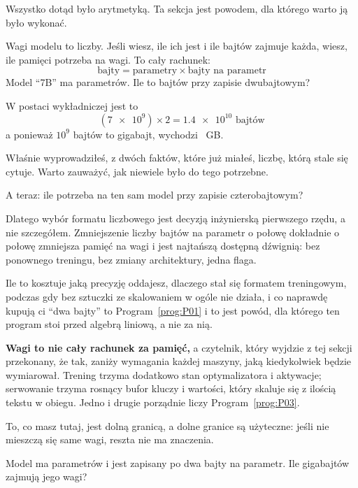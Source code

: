 \begin{fr}
Wszystko dotąd było arytmetyką. Ta sekcja jest powodem, dla którego warto ją
było wykonać.

Wagi modelu to liczby. Jeśli wiesz, ile ich jest i ile bajtów zajmuje każda,
wiesz, ile pamięci potrzeba na wagi. To cały rachunek:
\[ \text{bajty} = \text{parametry} \times \text{bajty na parametr} \]
Model \enquote{7B} ma  parametrów. Ile to bajtów przy zapisie
dwubajtowym?
\nextframe
\end{fr}

\begin{fr}
W postaci wykładniczej jest to
\[ (\num{7e9}) \times 2 = \num{1.4e10} \text{ bajtów} \]
a ponieważ $10^{9}$ bajtów to gigabajt, wychodzi ~GB.

Właśnie wyprowadziłeś, z dwóch faktów, które już miałeś, liczbę, którą stale
się cytuje. Warto zauważyć, jak niewiele było do tego potrzebne.

A teraz: ile potrzeba na ten sam model przy zapisie czterobajtowym?
\nextframe
\end{fr}

\begin{fr}
\begin{aibox}
Dlatego wybór formatu liczbowego jest decyzją inżynierską pierwszego rzędu, a
nie szczegółem. Zmniejszenie liczby bajtów na parametr o połowę dokładnie o
połowę zmniejsza pamięć na wagi i jest najtańszą dostępną dźwignią: bez
ponownego treningu, bez zmiany architektury, jedna flaga.

Ile to kosztuje \dash{} jaką precyzję oddajesz, dlaczego  stał się
formatem treningowym, podczas gdy  bez sztuczki ze skalowaniem w
ogóle nie działa, i co naprawdę kupują ci \enquote{dwa bajty} \dash{} to
Program~\ref{prog:P01} i to jest powód, dla którego ten program stoi przed
algebrą liniową, a nie za nią.
\end{aibox}

\begin{warning}
\textbf{Wagi to nie cały rachunek za pamięć,} a czytelnik, który wyjdzie z tej
sekcji przekonany, że tak, zaniży wymagania każdej maszyny, jaką kiedykolwiek
będzie wymiarował. Trening trzyma dodatkowo stan optymalizatora i aktywacje;
serwowanie trzyma rosnący bufor kluczy i wartości, który skaluje się z ilością
tekstu w obiegu. Jedno i drugie porządnie liczy Program~\ref{prog:P03}.

To, co masz tutaj, jest dolną granicą, a dolne granice są użyteczne: jeśli nie
mieszczą się same wagi, reszta nie ma znaczenia.
\end{warning}

\yourturn
Model ma  parametrów i jest zapisany po dwa bajty na
parametr. Ile gigabajtów zajmują jego wagi?
\dotline
\nextframe
\end{fr}

